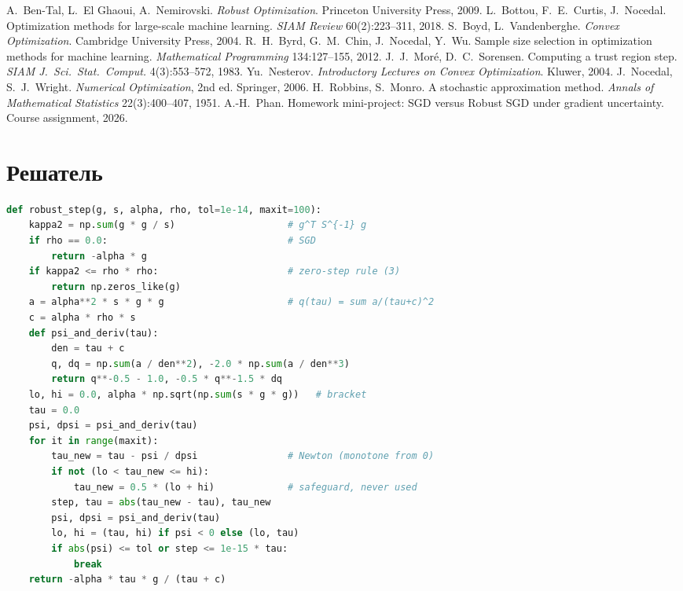 \documentclass[11pt,a4paper]{article}
\begin{document}
\begin{thebibliography}{9}
 A.~Ben-Tal, L.~El Ghaoui, A.~Nemirovski. \emph{Robust Optimization}. Princeton
University Press, 2009.
 L.~Bottou, F.~E.~Curtis, J.~Nocedal. Optimization methods for large-scale machine
learning. \emph{SIAM Review} 60(2):223--311, 2018.
 S.~Boyd, L.~Vandenberghe. \emph{Convex Optimization}. Cambridge University Press,
2004.
 R.~H.~Byrd, G.~M.~Chin, J.~Nocedal, Y.~Wu. Sample size selection in optimization
methods for machine learning. \emph{Mathematical Programming} 134:127--155, 2012.
 J.~J.~Moré, D.~C.~Sorensen. Computing a trust region step. \emph{SIAM J.\ Sci.\
Stat.\ Comput.} 4(3):553--572, 1983.
 Yu.~Nesterov. \emph{Introductory Lectures on Convex Optimization}. Kluwer, 2004.
\bibitem{nocedal} J.~Nocedal, S.~J.~Wright. \emph{Numerical Optimization}, 2nd ed. Springer, 2006.
\bibitem{robbins} H.~Robbins, S.~Monro. A stochastic approximation method. \emph{Annals of
Mathematical Statistics} 22(3):400--407, 1951.
 A.-H.~Phan. Homework mini-project: SGD versus Robust SGD under gradient uncertainty.
Course assignment, 2026.
\end{thebibliography}

\appendix
\section{Решатель}\label{app:solver}
\begin{lstlisting}[language=Python]
def robust_step(g, s, alpha, rho, tol=1e-14, maxit=100):
    kappa2 = np.sum(g * g / s)                    # g^T S^{-1} g
    if rho == 0.0:                                # SGD
        return -alpha * g
    if kappa2 <= rho * rho:                       # zero-step rule (3)
        return np.zeros_like(g)
    a = alpha**2 * s * g * g                      # q(tau) = sum a/(tau+c)^2
    c = alpha * rho * s
    def psi_and_deriv(tau):
        den = tau + c
        q, dq = np.sum(a / den**2), -2.0 * np.sum(a / den**3)
        return q**-0.5 - 1.0, -0.5 * q**-1.5 * dq
    lo, hi = 0.0, alpha * np.sqrt(np.sum(s * g * g))   # bracket
    tau = 0.0
    psi, dpsi = psi_and_deriv(tau)
    for it in range(maxit):
        tau_new = tau - psi / dpsi                # Newton (monotone from 0)
        if not (lo < tau_new <= hi):
            tau_new = 0.5 * (lo + hi)             # safeguard, never used
        step, tau = abs(tau_new - tau), tau_new
        psi, dpsi = psi_and_deriv(tau)
        lo, hi = (tau, hi) if psi < 0 else (lo, tau)
        if abs(psi) <= tol or step <= 1e-15 * tau:
            break
    return -alpha * tau * g / (tau + c)
\end{lstlisting}
\end{document}
